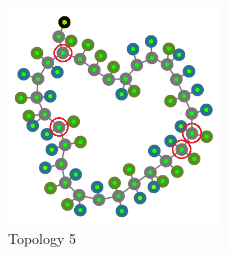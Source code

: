 \documentclass[conference]{IEEEtran}
\begin{document}
		\begin{figure}[!htp]
			\centering
				\centering
				\includegraphics[width=0.5\textwidth]{pics/topo_6.png}
				\caption{Topology 5}
				\label{img:topo_6}
		\end{figure}
	
\end{document}

